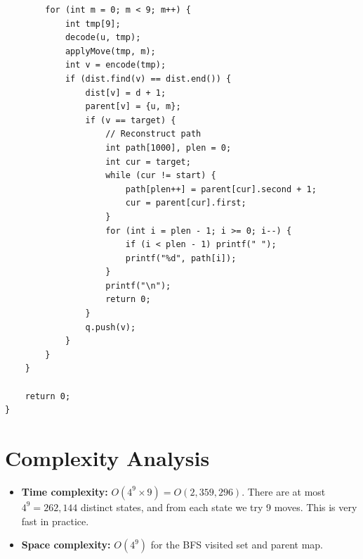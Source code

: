 \documentclass[11pt,a4paper]{article}
\begin{document}
\begin{lstlisting}
        for (int m = 0; m < 9; m++) {
            int tmp[9];
            decode(u, tmp);
            applyMove(tmp, m);
            int v = encode(tmp);
            if (dist.find(v) == dist.end()) {
                dist[v] = d + 1;
                parent[v] = {u, m};
                if (v == target) {
                    // Reconstruct path
                    int path[1000], plen = 0;
                    int cur = target;
                    while (cur != start) {
                        path[plen++] = parent[cur].second + 1;
                        cur = parent[cur].first;
                    }
                    for (int i = plen - 1; i >= 0; i--) {
                        if (i < plen - 1) printf(" ");
                        printf("%d", path[i]);
                    }
                    printf("\n");
                    return 0;
                }
                q.push(v);
            }
        }
    }

    return 0;
}
\end{lstlisting}

\section{Complexity Analysis}

\begin{itemize}
  \item \textbf{Time complexity:} $O(4^9 \times 9) = O(2{,}359{,}296)$.
        There are at most $4^9 = 262{,}144$ distinct states, and from each state
        we try 9 moves. This is very fast in practice.
  \item \textbf{Space complexity:} $O(4^9)$ for the BFS visited set and parent map.
\end{itemize}
\end{document}
